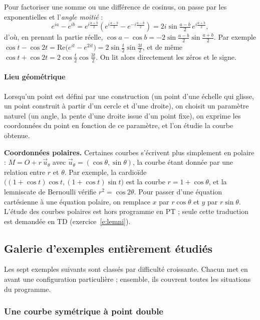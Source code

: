 \documentclass[a4paper,11pt]{article}
\numberwithin{equation}{section}
\numberwithin{figure}{section}
\numberwithin{table}{section}
\theoremstyle{enonce}
\theoremstyle{exemple}
\theoremstyle{remarque}
\newcommand{\ve}[1]{\vec{#1}}
\begin{document}
\begin{astuce}
Pour factoriser une somme ou une différence de cosinus, on passe par les exponentielles et l'\emph{angle moitié} :
\[e^{ia}-e^{ib}=e^{i\frac{a+b}2}\left(e^{i\frac{a-b}2}-e^{-i\frac{a-b}2}\right)=2i\sin\tfrac{a-b}2\,e^{i\frac{a+b}2},\]
d'où, en prenant la partie réelle, $\cos a-\cos b=-2\sin\frac{a-b}2\sin\frac{a+b}2$. Par exemple
$\cos t-\cos2t=\mathrm{Re}\big(e^{it}-e^{2it}\big)=2\sin\frac t2\sin\frac{3t}2$, et de même
$\cos t+\cos2t=2\cos\frac t2\cos\frac{3t}2$. On lit alors directement les zéros et le signe.
\end{astuce}

\paragraph{Lieu géométrique} Lorsqu'un point est défini par une construction (un point d'une échelle qui glisse, un point
construit à partir d'un cercle et d'une droite), on choisit un paramètre naturel (un angle, la pente d'une droite issue
d'un point fixe), on exprime les coordonnées du point en fonction de ce paramètre, et l'on étudie la courbe obtenue.

\begin{horsprogramme}
\textbf{Coordonnées polaires.} Certaines courbes s'écrivent plus simplement en polaire : $M=O+r\,\ve u_\theta$ avec
$\ve u_\theta=(\cos\theta,\sin\theta)$, la courbe étant donnée par une relation entre $r$ et $\theta$. Par exemple, la
cardioïde $\big((1+\cos t)\cos t,(1+\cos t)\sin t\big)$ est la courbe $r=1+\cos\theta$, et la lemniscate de Bernoulli vérifie
$r^2=\cos2\theta$. Pour passer d'une équation cartésienne à une équation polaire, on remplace $x$ par $r\cos\theta$ et $y$
par $r\sin\theta$. L'étude des courbes polaires est hors programme en PT ; seule cette traduction est demandée en TD
(exercice~\ref{e:lemni}).
\end{horsprogramme}

\subsection{Galerie d'exemples entièrement étudiés}

Les sept exemples suivants sont classés par difficulté croissante. Chacun met en avant une configuration particulière ;
ensemble, ils couvrent toutes les situations du programme.

\subsubsection{Une courbe symétrique à point double}
\end{document}
